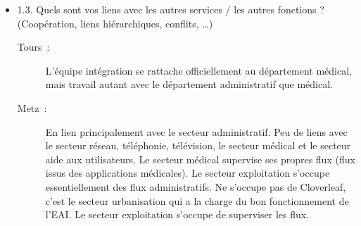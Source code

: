 \begin{itemize}
\begin{description}
\begin{figure}[!H]
		\end{figure}
	  \end{description}
	  
	  \item 1.3. Quels sont vos liens avec les autres services / les autres
	  fonctions ? (Coopération, liens hiérarchiques, conflits, …)
	  \begin{description}
	  	\item[Tours~:] L’équipe intégration se rattache officiellement au
	  	département médical, mais travail autant avec le département administratif
	  	que médical.
	  	\item[Metz~:] En lien principalement avec le secteur administratif. Peu de
	  	liens avec le secteur réseau, téléphonie, télévision, le secteur médical et
	  	le secteur aide aux utilisateurs. Le secteur médical supervise ses propres
	  	flux (flux issus des applications médicales). Le secteur exploitation
	  	s’occupe essentiellement des flux administratifs. Ne s’occupe pas de
	  	Cloverleaf, c’est le secteur urbanisation qui a la charge du bon
	  	fonctionnement de l’EAI. Le secteur exploitation s’occupe de superviser les
	  	flux.
	  \end{description}
	\end{itemize}
	
